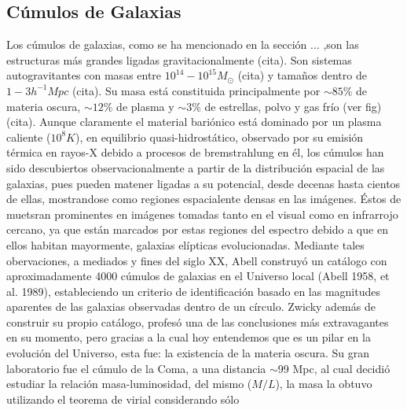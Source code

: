 



\subsection{C\'umulos de Galaxias}
Los c\'umulos de galaxias, como se ha mencionado en la secci\'on ... ,son las estructuras m\'as grandes
ligadas gravitacionalmente (cita). Son sistemas autogravitantes con masas entre
$10^{14}-10^{15} M_\odot$ (cita) y tama\~nos dentro de $1-3h^{-1}Mpc$ (cita).
Su masa est\'a constituida principalmente por $\sim 85\%$ de materia oscura,
$\sim12\%$ de plasma y $\sim3\%$ de estrellas,
polvo y gas fr\'io (ver fig) (cita). Aunque claramente el material bari\'onico est\'a dominado por
un plasma caliente ($10^{8}K$), en equilibrio quasi-hidrost\'atico, 
observado por su emisi\'on t\'ermica en rayos-X debido a procesos de bremstrahlung en \'el, 
los c\'umulos han sido descubiertos observacionalmente
a partir de la distribuci\'on espacial de las galaxias,
pues pueden matener ligadas a su potencial, desde decenas hasta cientos de ellas, mostrandose
como regiones espacialente densas en las im\'agenes. \'Estos de muetsran prominentes 
en im\'agenes tomadas tanto en el visual como en infrarrojo cercano, ya que est\'an
marcados por estas regiones del espectro debido a que en ellos habitan mayormente, galaxias
el\'ipticas evolucionadas.
Mediante tales obervaciones, a mediados y fines del siglo XX, Abell construy\'o un cat\'alogo
con aproximadamente 4000 c\'umulos de galaxias en el Universo local (Abell 1958, et al. 1989),
estableciendo un criterio de identificaci\'on basado en las magnitudes aparentes
de las galaxias observadas dentro de un c\'irculo.
Zwicky adem\'as de construir su propio cat\'alogo,  profes\'o una de las conclusiones
m\'as extravagantes en su momento, pero gracias a la cual hoy entendemos que es un pilar en la evoluci\'on
del Universo, esta fue: la existencia de la materia oscura. Su gran laboratorio
fue el c\'umulo de la Coma, a una distancia $\sim$99 Mpc, al cual decidi\'o estudiar la relaci\'on
masa-luminosidad, del mismo ($M/L$), la masa la obtuvo utilizando el teorema de virial considerando s\'olo
